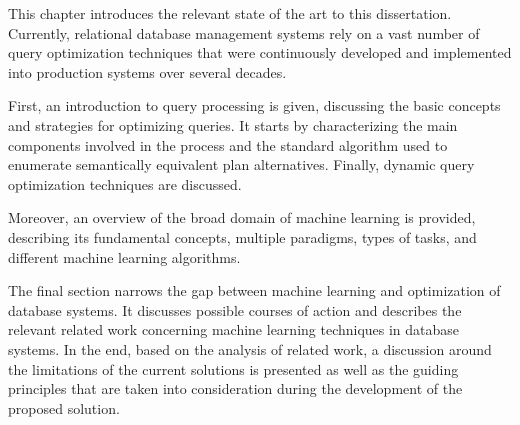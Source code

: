 This chapter introduces the relevant state of the art to this dissertation. Currently, relational database management systems rely on a vast number of query optimization techniques that were continuously developed and implemented into production systems over several decades.

First, an introduction to query processing is given, discussing the basic concepts and strategies for optimizing queries. It starts by characterizing the main components involved in the process and the standard algorithm used to enumerate semantically equivalent plan alternatives. Finally, dynamic query optimization techniques are discussed.

Moreover, an overview of the broad domain of machine learning is provided, describing its fundamental concepts, multiple paradigms, types of tasks, and different machine learning algorithms.

The final section narrows the gap between machine learning and optimization of database systems. It discusses possible courses of action and describes the relevant related work concerning machine learning techniques in database systems. In the end, based on the analysis of related work, a discussion around the limitations of the current solutions is presented as well as the guiding principles that are taken into consideration during the development of the proposed solution.
